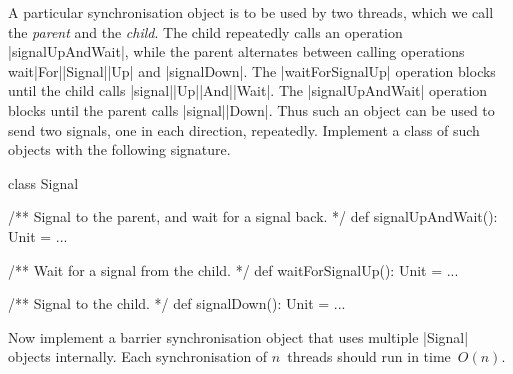 \begin{questionS}
A particular synchronisation object is to be used by two threads, which we
call the \emph{parent} and the \emph{child}.  The child repeatedly calls an
operation |signalUpAndWait|, while the parent alternates between calling
operations {\scalastyle wait}\-|For|\-|Signal|\-|Up| and |signalDown|.  The
|waitForSignalUp| operation blocks until the child calls
|signal|\-|Up|\-|And|\-|Wait|.  The |signalUpAndWait| operation blocks until
the parent calls |signal|\-|Down|.  Thus such an object can be used to
send two signals, one in each direction, repeatedly.  Implement a class of such
objects with the following signature.
%
\begin{scala}
class Signal{
  /** Signal to the parent, and wait for a signal back. */
  def signalUpAndWait(): Unit = ...

  /** Wait for a signal from the child. */
  def waitForSignalUp(): Unit = ...

  /** Signal to the child. */
  def signalDown(): Unit = ...
} 
\end{scala}

Now implement a barrier synchronisation object that uses multiple |Signal|
objects internally.  Each synchronisation of $n$~threads should run in
time~$O(n)$.
\end{questionS}


